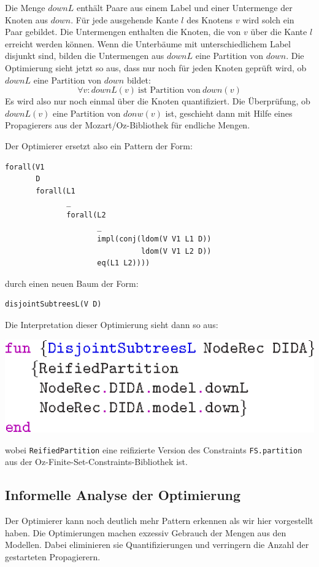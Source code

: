 Die Menge $\mathit{downL}$ enth\"alt Paare aus einem Label und einer
Untermenge der Knoten aus $\mathit{down}$. F\"ur jede ausgehende Kante
$l$ des Knotens $v$ wird solch ein Paar gebildet. Die Untermengen
enthalten die Knoten, die von $v$ \"uber die Kante $l$ erreicht werden
k\"onnen. Wenn die Unterb\"aume mit unterschiedlichem Label disjunkt
sind, bilden die Untermengen aus $\mathit{downL}$ eine Partition von
$\mathit{down}$. Die Optimierung sieht jetzt so aus, dass nur noch
f\"ur jeden Knoten gepr\"uft wird, ob $\mathit{downL}$ eine Partition
von $\mathit{down}$ bildet:
$$\forall v: \mathit{downL}(v) ~ \text{ist Partition von} ~\mathit{down}(v)$$
Es wird also nur noch einmal \"uber die Knoten quantifiziert. Die
\"Uberpr\"ufung, ob $\mathit{downL}(v)$ eine Partition von
$\mathit{donw}(v)$ ist, geschieht dann mit Hilfe eines Propagierers
aus der Mozart/Oz-Bibliothek f\"ur endliche Mengen.

Der Optimierer ersetzt also ein Pattern der Form:
\begin{verbatim}
forall(V1
       D
       forall(L1
              _
              forall(L2
                     _              
                     impl(conj(ldom(V V1 L1 D))
                               ldom(V V1 L2 D))
                     eq(L1 L2))))
\end{verbatim} 
durch einen neuen Baum der Form:
\begin{verbatim}
disjointSubtreesL(V D)
\end{verbatim}
Die Interpretation dieser Optimierung sieht dann so aus:
\begin{center}
\includegraphics[scale=1.0]{eps/opti2}
\end{center}
wobei {\tt ReifiedPartition} eine reifizierte Version des Constraints
{\tt FS.partition} aus der Oz-Finite-Set-Constraints-Bibliothek
ist.

\subsection{Informelle Analyse der Optimierung}

Der Optimierer kann noch deutlich mehr Pattern erkennen als wir hier
vorgestellt haben. Die Optimierungen machen exzessiv Gebrauch der
Mengen aus den Modellen. Dabei eliminieren sie Quantifizierungen und
verringern die Anzahl der gestarteten Propagierern.

